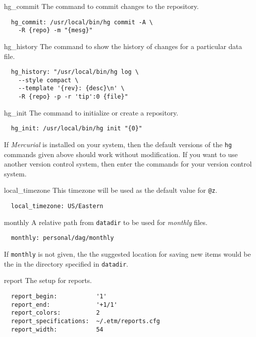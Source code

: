 \documentclass[10pt,landscape]{article}
\begin{document}
\begin{multicols}{3}
\begin{compactdesc}
\item[hg\_commit] The command to commit changes to the repository.
\begin{verbatim}
  hg_commit: /usr/local/bin/hg commit -A \
    -R {repo} -m "{mesg}"
\end{verbatim}

\item[hg\_history] The command to show the history of changes for a particular data file.
\begin{verbatim}
  hg_history: "/usr/local/bin/hg log \
    --style compact \
    --template '{rev}: {desc}\n' \
    -R {repo} -p -r 'tip':0 {file}"
\end{verbatim}

\item[hg\_init] The command to initialize or create a repository.
\begin{verbatim}
  hg_init: /usr/local/bin/hg init "{0}"
\end{verbatim}

\end{compactdesc}

If \emph{Mercurial} is installed on your system, then the default versions of the \verb'hg' commands given above should work without modification. If you want to use another version control system, then enter the commands for your version control system.

\begin{compactdesc}
\vskip3pt

\item[local\_timezone] This timezone will be used as the default value for \verb'@z'.
\begin{verbatim}
  local_timezone: US/Eastern
\end{verbatim}

\item[monthly] A relative path from \verb'datadir' to be used for \emph{monthly} files.
\begin{verbatim}
  monthly: personal/dag/monthly
\end{verbatim}
If \verb'monthly' is not given, the the suggested location for saving new items would be the in the directory specified in \verb'datadir'.

\item[report] The setup for reports.
\begin{verbatim}
  report_begin:           '1'
  report_end:             '+1/1'
  report_colors:          2
  report_specifications:  ~/.etm/reports.cfg
  report_width:           54
\end{verbatim}


\end{compactdesc}
\end{multicols}
\end{document}

